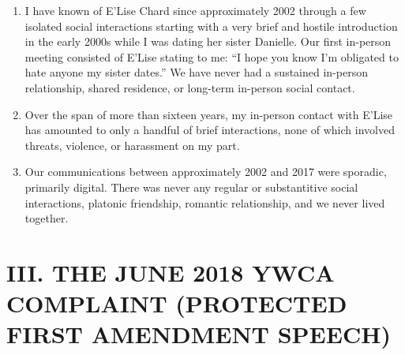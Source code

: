 \documentclass[12pt,letterpaper]{article}
\begin{document}
\begin{enumerate}

\item I have known of E'Lise Chard since approximately 2002 through a few isolated social interactions starting with a very brief and hostile introduction in the early 2000s while I was dating her sister Danielle. Our first in-person meeting consisted of E'Lise stating to me: ``I hope you know I'm obligated to hate anyone my sister dates.'' We have never had a sustained in-person relationship, shared residence, or long-term in-person social contact.

\item Over the span of more than sixteen years, my in-person contact with E'Lise has amounted to only a handful of brief interactions, none of which involved threats, violence, or harassment on my part.

\item Our communications between approximately 2002 and 2017 were sporadic, primarily digital. There was never any regular or substantitive social interactions, platonic friendship, romantic relationship, and we never lived together.

\end{enumerate}

\section*{III. THE JUNE 2018 YWCA COMPLAINT (PROTECTED FIRST AMENDMENT SPEECH)}
\end{document}
